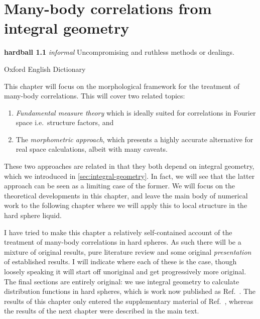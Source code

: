 \documentclass[11pt]{report}
\begin{document}
\chapter{Many-body correlations from integral geometry}
\epigraph{\textbf{hardball 1.1} \emph{informal} Uncompromising and ruthless methods or dealings.}{Oxford English Dictionary}

This chapter will focus on the morphological framework for the treatment of many-body correlations.
This will cover two related topics:
\begin{enumerate}
\item \emph{Fundamental measure theory} which is ideally suited for correlations in Fourier space i.e.\ structure factors, and
\item The \emph{morphometric approach}, which presents a highly accurate alternative for real space calculations, albeit with many caveats.
\end{enumerate}
These two approaches are related in that they both depend on integral geometry, which we introduced in \ref{sec:integral-geometry}.
In fact, we will see that the latter approach can be seen as a limiting case of the former.
We will focus on the theoretical developments in this chapter, and leave the main body of numerical work to the following chapter where we will apply this to local structure in the hard sphere liquid.

I have tried to make this chapter a relatively self-contained account of the treatment of many-body correlations in hard spheres.
As such there will be a mixture of original results, pure literature review and some original \emph{presentation} of established results.
I will indicate where each of these is the case, though loosely speaking it will start off unoriginal and get progressively more original.
The final sections are entirely original: we use integral geometry to calculate distribution functions in hard spheres, which is work now published as Ref.\ \cite{Robinson2019}.
The results of this chapter only entered the supplementary material of Ref.\ \cite{Robinson2019}, whereas the results of the next chapter were described in the main text.
\end{document}
